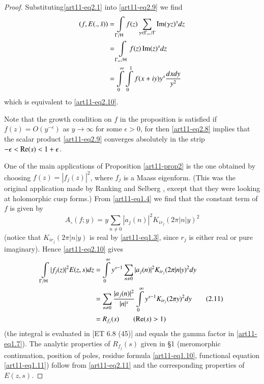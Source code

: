\begin{proof}
Substituting\pageoriginale \eqref{art11-eq2.1} into \eqref{art11-eq2.9} we find 
\begin{align*}
(f, E (., \bar{s})) & = \int\limits_{\Gamma / \mathsf{H}} f(z) \sum\limits_{\gamma  \in\Gamma_\infty/ \Gamma} \operatorname{Im} (\gamma z)^s dz \\
& =\int\limits_{\Gamma_\infty/ \mathsf{H}} f(z) \operatorname{Im} (z)^s dz\\
& = \int\limits^\infty_{0} \int\limits^1_0 f (x + iy) y^s \frac{dx dy}{y^2}
\end{align*}
which is equivalent to \eqref{art11-eq2.10}.

Note that the growth condition on $f$ in the proposition is satisfied if $f(z) = O (y^{-\epsilon})$ as $y \to \infty$ for some $\epsilon >0$, for then \eqref{art11-eq2.8} implies that the scalar product \eqref{art11-eq2.9} converges absolutely in the strip $-\epsilon < \operatorname{Re} (s) < 1+ \epsilon$.

One of the main applications of Proposition \eqref{art11-prop2} is the one obtained by choosing $f(z) = |f_j(z)|^2$, where $f_j$ is a Maass eigenform. (This was the original application made by Ranking \cite{art11-5} and Selberg \cite{art11-6}, except that they were looking at holomorphic cusp forms.) From \eqref{art11-eq1.4} we find that the constant term of $f$ is given by 
$$
A_\circ (f; y) = y \sum\limits_{n \neq 0} |a_j (n)|^2 K_{ir_j} (2\pi|n|y)^2
$$
(notice that $K_{ir_j} (2\pi|n|y)$ is real by \eqref{art11-eq1.3}, since $r_j$ is either real or pure imaginary). Hence \eqref{art11-eq2.10} gives 
\begin{align*}
\int\limits_{\Gamma / \mathsf{H}} |f_j(z)|^2 E (z,s) dz & = \int\limits^\infty_0 y^{s-1} \sum\limits_{n \neq 0} |a_j(n)|^2 K_{ir_j} (2 \pi |n| y)^2 dy\\
& = \sum\limits_{n \neq 0} \frac{|a_j(n)|^2}{|n|^s} \int\limits^\infty_{0} y^{s-1} K_{ir_j} (2\pi y)^2 dy \tag{2.11}\label{art11-eq2.11}\\
& = R_{f_j}(s) \qquad (\operatorname{Re} (s) > 1)
\end{align*}
(the integral is evaluated in [ET 6.8 (45)] and equals the gamma factor in \eqref{art11-eq1.7}). The analytic properties of $R_{f_j}(s)$ given in \S 1 (meromorphic continuation, position of poles, residue formula \eqref{art11-eq1.10}, functional equation \eqref{art11-eq1.11}) follow from \eqref{art11-eq2.11} and the corresponding properties of $E(z,s)$.
\end{proof}

